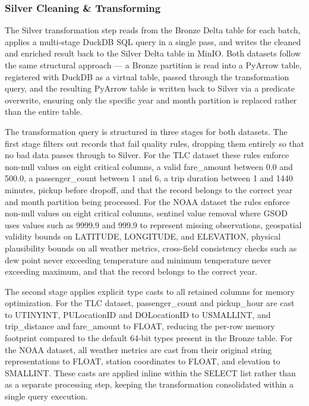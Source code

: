 \documentclass[conference]{IEEEtran}
\begin{document}
\subsubsection{Silver Cleaning \& Transforming}

The Silver transformation step reads from the Bronze Delta table for each batch, applies a multi-stage DuckDB SQL query in a single pass, and writes the cleaned and enriched result back to the Silver Delta table in MinIO. Both datasets follow the same structural approach --- a Bronze partition is read into a PyArrow table, registered with DuckDB as a virtual table, passed through the transformation query, and the resulting PyArrow table is written back to Silver via a predicate overwrite, ensuring only the specific year and month partition is replaced rather than the entire table.

The transformation query is structured in three stages for both datasets. The first stage filters out records that fail quality rules, dropping them entirely so that no bad data passes through to Silver. For the TLC dataset these rules enforce non-null values on eight critical columns, a valid fare\_amount between 0.0 and 500.0, a passenger\_count between 1 and 6, a trip duration between 1 and 1440 minutes, pickup before dropoff, and that the record belongs to the correct year and month partition being processed. For the NOAA dataset the rules enforce non-null values on eight critical columns, sentinel value removal where GSOD uses values such as 9999.9 and 999.9 to represent missing observations, geospatial validity bounds on LATITUDE, LONGITUDE, and ELEVATION, physical plausibility bounds on all weather metrics, cross-field consistency checks such as dew point never exceeding temperature and minimum temperature never exceeding maximum, and that the record belongs to the correct year.

The second stage applies explicit type casts to all retained columns for memory optimization. For the TLC dataset, passenger\_count and pickup\_hour are cast to UTINYINT, PULocationID and DOLocationID to USMALLINT, and trip\_distance and fare\_amount to FLOAT, reducing the per-row memory footprint compared to the default 64-bit types present in the Bronze table. For the NOAA dataset, all weather metrics are cast from their original string representations to FLOAT, station coordinates to FLOAT, and elevation to SMALLINT. These casts are applied inline within the SELECT list rather than as a separate processing step, keeping the transformation consolidated within a single query execution.
\end{document}
